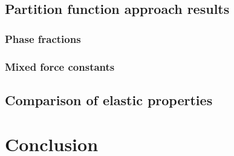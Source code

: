 \subsection{Partition function approach results}

\subsubsection{Phase fractions}

\subsubsection{Mixed force constants}

\subsection{Comparison of elastic properties}

\section{Conclusion}



